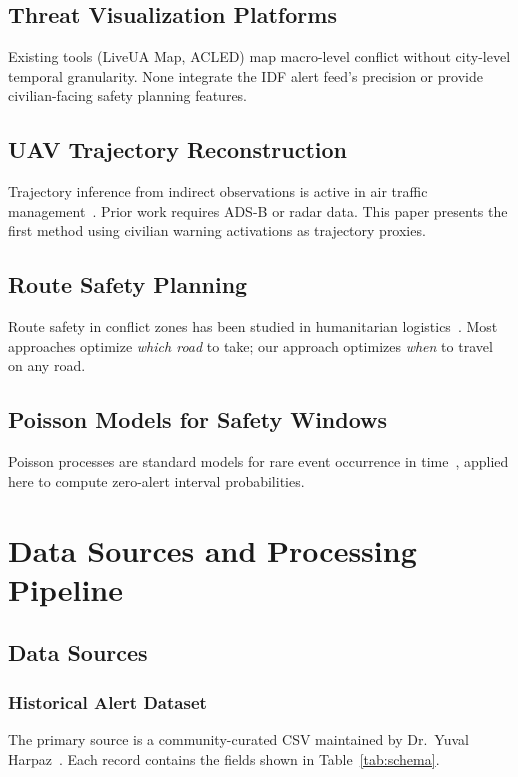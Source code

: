 \documentclass[12pt,a4paper]{article}
\begin{document}
\subsection{Threat Visualization Platforms}
Existing tools (LiveUA Map, ACLED) map macro-level conflict without city-level
temporal granularity. None integrate the IDF alert feed's precision or provide
civilian-facing safety planning features.

\subsection{UAV Trajectory Reconstruction}
Trajectory inference from indirect observations is active in air traffic
management~\cite{olive2019}. Prior work requires ADS-B or radar data. This paper
presents the first method using civilian warning activations as trajectory proxies.

\subsection{Route Safety Planning}
Route safety in conflict zones has been studied in humanitarian
logistics~\cite{tomasini2009}. Most approaches optimize \emph{which road} to take;
our approach optimizes \emph{when} to travel on any road.

\subsection{Poisson Models for Safety Windows}
Poisson processes are standard models for rare event occurrence in
time~\cite{kingman1992}, applied here to compute zero-alert interval
probabilities.

\section{Data Sources and Processing Pipeline}
\label{sec:data}

\subsection{Data Sources}

\subsubsection{Historical Alert Dataset}
The primary source is a community-curated CSV maintained by Dr.\ Yuval
Harpaz~\cite{harpaz2023}. Each record contains the fields shown in
Table~\ref{tab:schema}.
\end{document}
